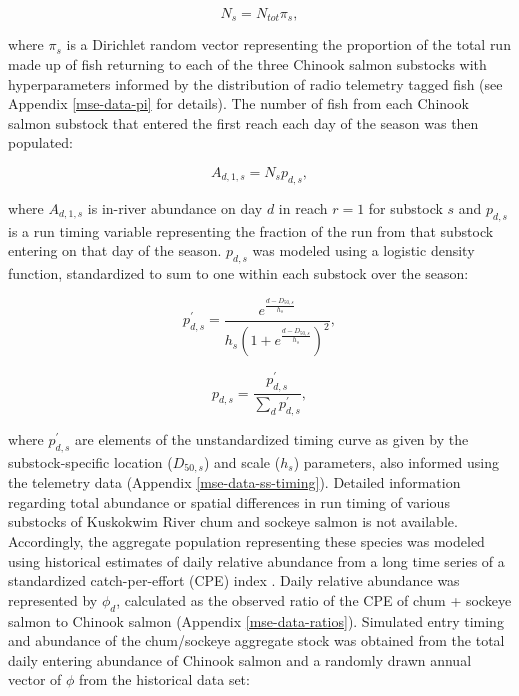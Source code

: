 \documentclass[12pt,]{book}
\theoremstyle{definition}
\theoremstyle{definition}
\theoremstyle{definition}
\theoremstyle{remark}
\begin{document}
\begin{equation}
  N_s=N_{tot} \pi_s,
  \label{eq:get-ns}
\end{equation}

\noindent
where \(\pi_s\) is a Dirichlet random vector representing the proportion
of the total run made up of fish returning to each of the three Chinook
salmon substocks with hyperparameters informed by the distribution of
radio telemetry tagged fish (see Appendix \ref{mse-data-pi} for
details). The number of fish from each Chinook salmon substock that
entered the first reach each day of the season was then populated:

\begin{equation}
A_{d,1,s}=N_s p_{d,s},
  \label{eq:get-chin-entry}
\end{equation}

\noindent
where \(A_{d,1,s}\) is in-river abundance on day \(d\) in reach
\(r = 1\) for substock \(s\) and \(p_{d,s}\) is a run timing variable
representing the fraction of the run from that substock entering on that
day of the season. \(p_{d,s}\) was modeled using a logistic density
function, standardized to sum to one within each substock over the
season:

\begin{equation}
  p^{\prime}_{d,s} = \frac{e^{\frac{d-D_{50,s}}{h_s}}}{h_s \left(1 + e^{\frac{d-D_{50,s}}{h_s}} \right)^2},
  \label{eq:get-p-prime}
\end{equation}

\begin{equation}
  p_{d,s}=\frac{p^{\prime}_{d,s}}{\sum_d p^{\prime}_{d,s}},
  \label{eq:get-p}
\end{equation}

\noindent
where \(p^{\prime}_{d,s}\) are elements of the unstandardized timing
curve as given by the substock-specific location (\(D_{50,s}\)) and
scale (\(h_s\)) parameters, also informed using the telemetry data
(Appendix \ref{mse-data-ss-timing}). Detailed information regarding
total abundance or spatial differences in run timing of various
substocks of Kuskokwim River chum and sockeye salmon is not available.
Accordingly, the aggregate population representing these species was
modeled using historical estimates of daily relative abundance from a
long time series of a standardized catch-per-effort (CPE) index
\citep[the Bethel Test Fishery -- BTF;][]{bue-lipka-2016}. Daily
relative abundance was represented by \(\phi_d\), calculated as the
observed ratio of the CPE of chum + sockeye salmon to Chinook salmon
(Appendix \ref{mse-data-ratios}). Simulated entry timing and abundance
of the chum/sockeye aggregate stock was obtained from the total daily
entering abundance of Chinook salmon and a randomly drawn annual vector
of \(\phi\) from the historical data set:
\end{document}
